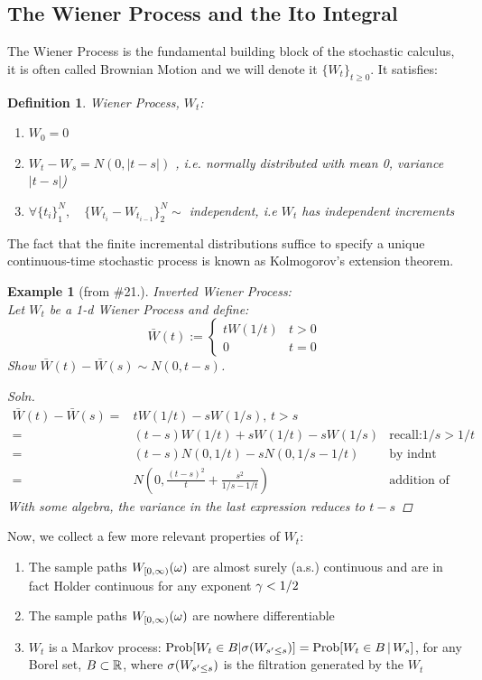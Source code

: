 \documentclass{article}
\newtheorem{ex}{Example}[thm]
\newtheorem{defn}{Definition}[thm]
\begin{document}
\subsection{The Wiener Process and the Ito Integral}
The Wiener Process is the fundamental building block of the stochastic calculus,
it is often called Brownian Motion and we will denote it $\{W_t\}_{t\geq 0}$. It
satisfies:
\begin{defn}Wiener Process, $W_t$:
\begin{enumerate}
  \item $W_0 = 0$
  \item $W_t - W_s = N(0, |t-s|)$ , i.e. normally distributed with mean 0,
  variance $|t-s|$)
  \item $\forall \{t_i\}_1^N, \quad \{W_{t_i} - W_{t_{i-1}} \}_2^N \sim$
  independent, i.e $W_t$ has independent increments
\end{enumerate}
\end{defn}
The fact that the finite incremental distributions suffice to specify a unique
continuous-time stochastic process is known as Kolmogorov's extension theorem.
\begin{ex}[from \cite{Evansa} \#21.] Inverted Wiener Process:
\\
Let $W_t$ be a 1-d Wiener Process and define:
\def \Wbar {{\bar{W} }}
\begin{equation*}
\Wbar(t) := \begin{cases}
t W(1/t) & t >0
\\
0 & t = 0
\end{cases}
\end{equation*}
Show $\Wbar(t)- \Wbar(s) \sim N(0, t-s)$.

\begin{proof}[Soln]
\begin{align*}
\Wbar(t) - \Wbar(s) =& t W(1/t) - s W(1/s), \, t>s
\\
=& (t-s)W(1/t) + s W(1/t) - sW(1/s) & \text{recall:} 1/s > 1/t
\\
=& (t-s)N(0, 1/t) - sN(0, 1/s -1/t) & \text{by indnt increments}
\\
=& N\left(0, \frac{(t-s)^2}t + \frac{s^2 }{ 1/s -1/t} \right) & \text{
addition of indnt normal RVs.}
\end{align*}
With some algebra, the variance in the last expression reduces to $t-s$
\end{proof}
\end{ex}

Now, we collect a few more relevant properties of $W_t$:
\begin{enumerate}
  \item The sample paths $W_{[0,\infty)}({\omega})$
are almost surely (a.s.) continuous and are in fact Holder continuous for any
exponent ${\gamma } < 1/2$
\item The sample paths $W_{[0,\infty)}({\omega})$ are nowhere differentiable
\item $W_t$ is a Markov process: $\operatorname{Prob}[W_t \in B | {\sigma }(W_{s' \leq s })] =
\operatorname{Prob}[W_t \in B \,| \,W_s]$, for any Borel set, $B \subset { \mathbb{R} }$, where ${\sigma }(W_{s'
\leq s })$ is the filtration generated by the $W_t$
\end{enumerate}
\end{document}
